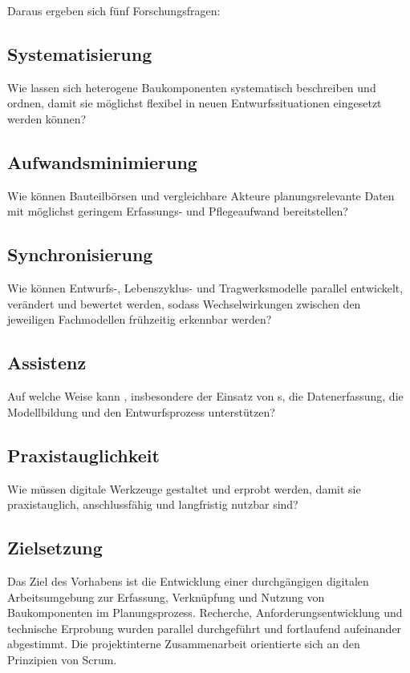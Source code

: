 \documentclass[type=zwischenbericht]{zukunftbau}
\begin{document}
Daraus ergeben sich fünf Forschungsfragen:

\subsection{Systematisierung}
Wie lassen sich heterogene Baukomponenten systematisch beschreiben und ordnen, damit sie möglichst flexibel in neuen Entwurfssituationen eingesetzt werden können?

\subsection{Aufwandsminimierung}
Wie können Bauteilbörsen und vergleichbare Akteure planungsrelevante Daten mit möglichst geringem Erfassungs- und Pflegeaufwand bereitstellen?

\subsection{Synchronisierung}
Wie können Entwurfs-, Lebenszyklus- und Tragwerksmodelle parallel entwickelt, verändert und bewertet werden, sodass Wechselwirkungen zwischen den jeweiligen Fachmodellen frühzeitig erkennbar werden?

\subsection{Assistenz}
Auf welche Weise kann , insbesondere der Einsatz von s, die Datenerfassung, die Modellbildung und den Entwurfsprozess unterstützen?

\subsection{Praxistauglichkeit}
Wie müssen digitale Werkzeuge gestaltet und erprobt werden, damit sie praxistauglich, anschlussfähig und langfristig nutzbar sind?

\subsection{Zielsetzung}
Das Ziel des Vorhabens ist die Entwicklung einer durchgängigen digitalen Arbeitsumgebung zur Erfassung, Verknüpfung und Nutzung von Baukomponenten im Planungsprozess. Recherche, Anforderungsentwicklung und technische Erprobung wurden parallel durchgeführt und fortlaufend aufeinander abgestimmt. Die projektinterne Zusammenarbeit orientierte sich an den Prinzipien von Scrum.
\end{document}

